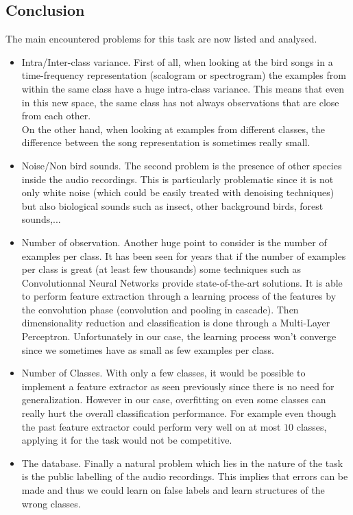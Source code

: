 \documentclass[a4paper]{report}
\begin{document}
\subsection{Conclusion}
The main encountered problems for this task are now listed and analysed.
\begin{itemize}
\item Intra/Inter-class variance. First of all, when looking at the bird songs in a time-frequency representation (scalogram or spectrogram) the examples from within the same class have a huge intra-class variance. This means that even in this new space, the same class has not always observations that are close from each other. 
\\
On the other hand, when looking at examples from different classes, the difference between the song representation is sometimes really small.
\item Noise/Non bird sounds. The second problem is the presence of other species inside the audio recordings. This is particularly problematic since it is not only white noise (which could be easily treated with denoising techniques) but also biological sounds such as insect, other background birds, forest sounds,...
\item Number of observation. Another huge point to consider is the number of examples per class. It has been seen for years that if the number of examples per class is great (at least few thousands) some techniques such as Convolutionnal Neural Networks provide state-of-the-art solutions. It is able to perform feature extraction through a learning process of the features by the convolution phase (convolution and pooling in cascade). Then dimensionality reduction and classification is done through a Multi-Layer Perceptron. Unfortunately in our case, the learning process won't converge since we sometimes have as small as few examples per class.
\item Number of Classes. With only a few classes, it would be possible to implement a feature extractor as seen previously since there is no need for generalization. However in our case, overfitting on even some classes can really hurt the overall classification performance. For example even though the past feature extractor could perform very well on at most $10$ classes, applying it for the task would not be competitive. 
\item The database. Finally a natural problem which lies in the nature of the task is the public labelling of the audio recordings. This implies that errors can be made and thus we could learn on false labels and learn structures of the wrong classes.
\end{itemize}
\end{document}
